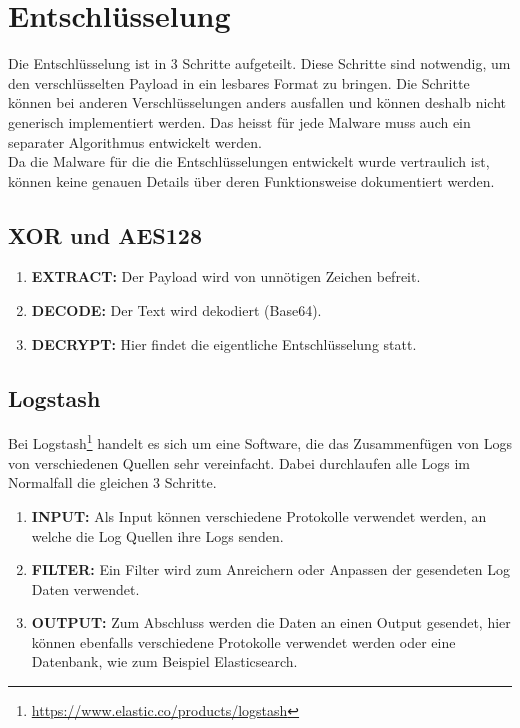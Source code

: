 

\section{Entschlüsselung}
Die Entschlüsselung ist in 3 Schritte aufgeteilt. Diese Schritte sind notwendig, um den verschlüsselten Payload in ein lesbares Format zu bringen. Die Schritte können bei anderen Verschlüsselungen anders ausfallen und können deshalb nicht generisch implementiert werden. Das heisst für jede Malware muss auch ein separater Algorithmus entwickelt werden.\\

Da die Malware für die die Entschlüsselungen entwickelt wurde vertraulich ist, können keine genauen Details über deren Funktionsweise dokumentiert werden.

\subsection{XOR und AES128}
\begin{enumerate}
	\item \textbf{EXTRACT:} Der Payload wird von unnötigen Zeichen befreit.
	\item \textbf{DECODE:} Der Text wird dekodiert (Base64).
	\item \textbf{DECRYPT:} Hier findet die eigentliche Entschlüsselung statt.
\end{enumerate}

\subsection{Logstash}
Bei Logstash\cite{elastic:logstash}\footnote{\url{https://www.elastic.co/products/logstash}} handelt es sich um eine Software, die das Zusammenfügen von Logs von verschiedenen Quellen sehr vereinfacht.
Dabei durchlaufen alle Logs im Normalfall die gleichen 3 Schritte.
\begin{enumerate}
	\item \textbf{INPUT:} Als Input können verschiedene Protokolle verwendet werden, an welche die Log Quellen ihre Logs senden.
	\item \textbf{FILTER:} Ein Filter wird zum Anreichern oder Anpassen der gesendeten Log Daten verwendet.
	\item \textbf{OUTPUT:} Zum Abschluss werden die Daten an einen Output gesendet, hier können ebenfalls verschiedene Protokolle verwendet werden oder eine Datenbank, wie zum Beispiel Elasticsearch.
\end{enumerate}



